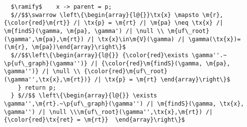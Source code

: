 \begin{lstlisting}
  $\ramify$    x -> parent = p;
  $//$$\swarrow \left\{\begin{array}{l@{}}\tx{x} \mapsto \m{r},{\color{red}\m{rt}} /| \tx{p} = \m{rt} /| \m{pa} \neq \tx{x} /| \m{findS}(\gamma, \m{pa}, \gamma') /| \null \\ \m{uf\_root}(\gamma',\m{pa},\m{rt}) /| \tx{x}\in\m{V}(\gamma) /| \gamma(\tx{x})=(\m{r}, \m{pa})\end{array}\right\}$
  $//$$\left\{\begin{array}{l@{}} {\color{red}\exists \gamma''.~ \p{uf\_graph}(\gamma'')} /| {\color{red}\m{findS}(\gamma, \m{pa}, \gamma'')} /| \null \\ {\color{red}\m{uf\_root}(\gamma'',\tx{x},\m{rt})} /| \tx{p} = \m{rt} \end{array}\right\}$
    } return p;
  } $//$$ \left\{\begin{array}{l@{}} \exists \gamma'',\m{rt}.~\p{uf\_graph}(\gamma'') /| \m{findS}(\gamma, \tx{x}, \gamma'') /| \null \\\m{uf\_root}(\gamma'',\tx{x},\m{rt}) /| {\color{red}\tx{ret} = \m{rt}}  \end{array}\right\}$
\end{lstlisting}

%
%
\vspace*{-1ex}


